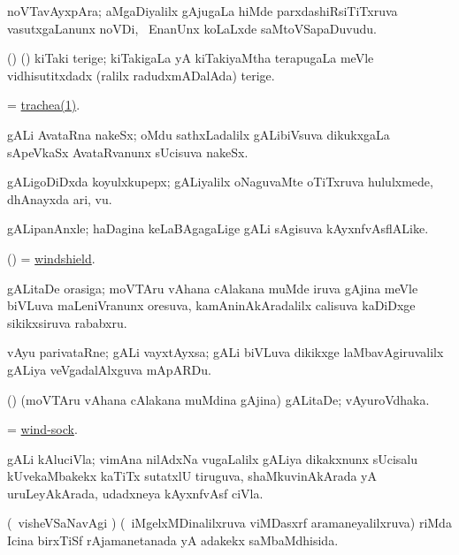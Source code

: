 \bentry
{}
\gl{\nA}
\bmng
noVTavAyxpAra; aMgaDiyalilx gAjugaLa hiMde parxdashiRsiTiTxruva vasutxgaLanunx noVDi, \sA\ EnanUnx koLaLxde saMtoVSapaDuvudu. 
\emng
\eentry

\bentry
{}
\gl{\nA}
\bmng
(\birx) (\ca) kiTaki terige; kiTakigaLa yA kiTakiyaMtha terapugaLa meVle vidhisutitxdadx (ralilx radudxmADalAda) terige. 
\emng
\eentry

\bentry
{}
\gl{\nA}
\bmng
= \hyperref{kandict_t.pdf}{T}{trachea(1)}{trachea(1)}. 
\emng
\eentry

\bentry
{}
\gl{\nA}
\bmng
gALi AvataRna nakeSx; oMdu sathxLadalilx gALibiVsuva dikukxgaLa sApeVkaSx AvataRvanunx sUcisuva nakeSx. 
\emng
\eentry

\bentry
{}
\gl{\nA}
\bmng
gALigoDiDxda koyulxkupepx; gALiyalilx oNaguvaMte oTiTxruva hululxmede, dhAnayxda ari, \mo vu. 
\emng
\eentry

\bentry
{}
\gl{\nA}
\bmng
gALipanAnxle; haDagina keLaBAgagaLige gALi sAgisuva kAyxnfvAsflALike. 
\emng
\eentry

\bentry
{}
\gl{\nA}
\bmng
(\birx) = \hyperlink{windshield}{windshield}. 
\emng

\noindent
\gl{\pagu}
\bmng
{} gALitaDe orasiga; moVTAru vAhana cAlakana muMde iruva gAjina meVle biVLuva maLeniVranunx oresuva, kamAninAkAradalilx calisuva kaDiDxge sikikxsiruva rababxru. 
\emng
\eentry

\bentry
{}
\gl{\nA}
\bmng
vAyu parivataRne; gALi vayxtAyxsa; gALi biVLuva dikikxge laMbavAgiruvalilx gALiya veVgadalAlxguva mApARDu. 
\emng
\eentry

\bentry
{}
\gl{\nA}
\bmng
(\ame) (moVTAru vAhana cAlakana muMdina gAjina) gALitaDe; vAyuroVdhaka. 
\emng
\eentry

\bentry
{}
\gl{\nA}
\bmng
= \hyperlink{wind-sock}{wind-sock}. 
\emng
\eentry

\bentry
{}
\gl{\nA}
\bmng
gALi kAluciVla; vimAna nilAdxNa \mo vugaLalilx gALiya dikakxnunx sUcisalu kUvekaMbakekx kaTiTx sutatxlU tiruguva, shaMkuvinAkArada yA uruLeyAkArada, udadxneya kAyxnfvAsf ciVla. 
\emng
\eentry

\bentry
{}
\gl{\nA} 
\bmng
(\sA\ visheVSaNavAgi \parx) (\da\ iMgelxMDinalilxruva viMDasxrf aramaneyalilxruva) riMda Icina birxTiSf rAjamanetanada yA adakekx saMbaMdhisida. 
\emng

